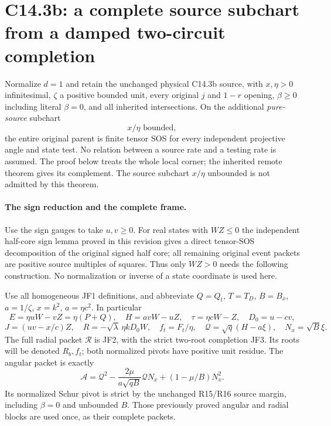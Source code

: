 \section{C14.3b: a complete source subchart from a damped two-circuit completion}

\begin{theorem}
Normalize $d=1$ and retain the unchanged physical C14.3b source, with $x,\eta>0$
infinitesimal, $\zeta$ a positive bounded unit, every original $j$
and $1-r$ opening, $\beta\ge0$ including literal $\beta=0$, and all inherited intersections.
On the additional \emph{pure-source} subchart
\[
                         x/\eta\text{ bounded},              \tag{DG1}
\]
the entire original parent is finite tensor SOS for every independent
projective angle and state test. No relation between a source rate
and a testing rate is assumed. The proof below treats the whole local
corner; the inherited remote theorem gives its complement. The source
subchart $x/\eta$ unbounded is not admitted by this theorem.
\end{theorem}

\paragraph{The sign reduction and the complete frame.}
Use the sign gauges to take $u,v\ge0$. For real states with $WZ\le0$
the independent half-core sign lemma proved in this revision gives a
direct tensor-SOS decomposition of the original signed half core;
all remaining original event packets are positive source multiples
of squares. Thus only $WZ>0$ needs the following construction. No
normalization or inverse of a state coordinate is used here.

Use all homogeneous JF1 definitions, and abbreviate $Q=Q_t$,
$T=T_D$, $B=B_x$, $a=1/\zeta$, $x=k^2$, $a=\eta c^2$. In particular
\[
 E=\eta uW-vZ=\eta(P+Q),\quad H=avW-uZ,
 \quad \tau=\eta cW-Z,\quad D_0=u-cv,
\]
\[
 J=(uv-x/c)Z,\quad
 R=-\sqrt\lambda\,\eta kD_0W,\quad
 f_t=F_t/\eta,\quad \mathcal Q=\sqrt q(H-a\xi),
 \quad N_x=\sqrt B\xi.
\]
The full radial packet $\mathscr R$ is JF2, with the strict two-root
completion JF3. Its roots will be denoted $R_b,f_t$; both normalized
pivots have positive unit residue. The angular packet is exactly
\[
 \mathscr A=\mathcal Q^2
       -\frac{2\mu}{a\sqrt{qB}}\mathcal QN_x
       +(1-\mu/B)N_x^2.                              \tag{DG2}
\]
Its normalized Schur pivot is strict by the unchanged R15/R16 source
margin, including $\beta=0$ and unbounded $B$. Those previously
proved angular and radial blocks are used once, as their complete
packets.

